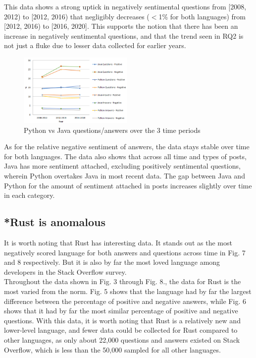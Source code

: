 \documentclass[conference]{IEEEtran}
\begin{document}
This data shows a strong uptick in negatively sentimental questions from [2008, 2012) to [2012, 2016) that negligibly decreases ($<$1\% for both languages) from [2012, 2016) to  [2016, 2020]. This supports the notion that there has been an increase in negatively sentimental questions, and that the trend seen in RQ2 is not just a fluke due to lesser data collected for earlier years.\\

\begin{figure}[htbp]
\centerline{\includegraphics[width=0.49\textwidth]{figures/Java-python-combined.png}}
\caption{Python vs Java questions/answers over the 3 time periods}
\label{fig}
\end{figure}

As for the relative negative sentiment of answers, the data stays stable over time for both languages. The data also shows that across all time and types of posts, Java has more sentiment attached, excluding positively sentimental questions, wherein Python overtakes Java in most recent data. The gap between Java and Python for the amount of sentiment attached in posts increases slightly over time in each category.\\

\subsection{*Rust is anomalous}
It is worth noting that Rust has interesting data. It stands out as the most negatively scored language for both answers and questions across time in Fig. 7 and 8 respectively. But it is also by far the most loved language among developers in the Stack Overflow survey. \\

Throughout the data shown in Fig. 3 through Fig. 8., the data for Rust is the most varied from the norm. Fig. 5 shows that the language had by far the largest difference between the percentage of positive and negative answers, while Fig. 6 shows that it had by far the most similar percentage of positive and negative questions. With this data, it is worth noting that Rust is a relatively new and lower-level language, and fewer data could be collected for Rust compared to other languages, as only about 22,000 questions and answers existed on Stack Overflow, which is less than the 50,000 sampled for all other languages.\\
\end{document}
